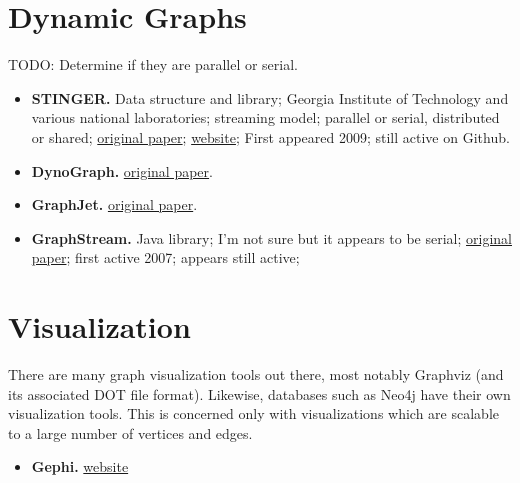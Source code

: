 \documentclass[11pt]{article}
\begin{document}
\section{Dynamic Graphs}
TODO: Determine if they are parallel or serial.
\begin{itemize}
	\item \textbf{STINGER.} Data structure and library; Georgia Institute of Technology and various national laboratories; streaming model; parallel or serial, distributed or shared; \href{http://cass-mt.pnnl.gov/docs/pubs/pnnlgeorgiatechsandiastinger-u.pdf}{original paper}; \href{http://www.stingergraph.com/}{website}; First appeared 2009; still active on Github.
	
	\item \textbf{DynoGraph.} \href{http://sc16.supercomputing.org/sc-archive/tech_poster/poster_files/post214s2-file3.pdf}{original paper}.
	
	\item \textbf{GraphJet.} \href{http://www.vldb.org/pvldb/vol9/p1281-sharma.pdf}{original paper}.
	
	\item \textbf{GraphStream.} Java library; I'm not sure but it appears to be serial; \href{https://arxiv.org/abs/0803.2093}{original paper}; first active 2007; appears still active;
\end{itemize}

\section{Visualization}
There are many graph visualization tools out there, most notably Graphviz (and its associated DOT file format). Likewise, databases such as Neo4j have their own visualization tools. This is concerned only with visualizations which are scalable to a large number of vertices and edges.

\begin{itemize}
	\item \textbf{Gephi.} \href{https://gephi.org/}{website}
\end{itemize}
\end{document}
